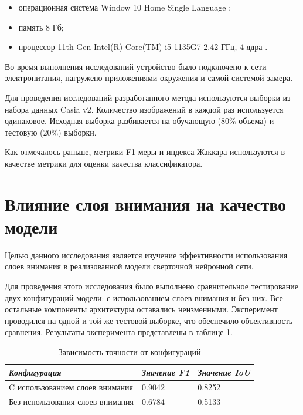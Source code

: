 \begin{itemize}
	\item[---] операционная система Window 10 Home Single Language \cite{window};
	\item[---] память 8 Гб;
	\item[---] процессор 11th Gen Intel(R) Core(TM) i5-1135G7 2.42 ГГц, 4 ядра \cite{cpu}.
\end{itemize}

Во время выполнения исследований устройство было подключено к сети электропитания, нагружено приложениями окружения и самой системой замера.

Для проведения исследований разработанного метода используются выборки из набора данных Casia v2. Количество изображений в каждой раз используется одинаковое. Исходная выборка разбивается на обучающую (80\% объема) и тестовую (20\%) выборки. 

Как отмечалось раньше, метрики F1-меры и индекса Жаккара используются в качестве метрики для оценки качества классификатора.

\section{Влияние слоя внимания на качество модели}

Целью данного исследования является изучение эффективности использования слоев внимания в реализованной модели сверточной нейронной сети. 

Для проведения этого исследования было выполнено сравнительное тестирование двух конфигураций модели: с использованием слоев внимания и без них. Все остальные компоненты архитектуры оставались неизменными. Эксперимент проводился на одной и той же тестовой выборке, что обеспечило объективность сравнения. Результаты эксперимента представлены в таблице \ref{tab:seam}.

\begin{table}[H]
    \centering
    \caption{Зависимость точности от конфигураций}\label{tab:seam}
    \begin{tabular}{|p{5.5cm}|p{4cm}|p{4cm}|}
		\hline
     \textit{Конфигурация} & \textit{{Значение F1}} & \textit{Значение IoU}\\ \hline
	\centering C использованием слоев внимания &  0.9042 &  0.8252 \\ \hline
    \centering Без использования слоев внимания &  0.6784 &  0.5133 \\\hline
    \end{tabular}
\end{table}

